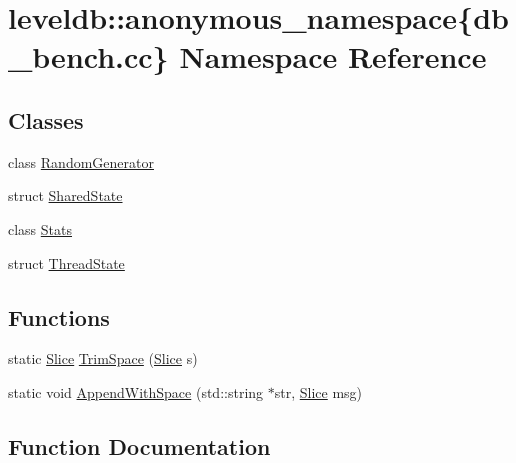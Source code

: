 \hypertarget{namespaceleveldb_1_1anonymous__namespace_02db__bench_8cc_03}{}\section{leveldb\+:\+:anonymous\+\_\+namespace\{db\+\_\+bench.\+cc\} Namespace Reference}
\label{namespaceleveldb_1_1anonymous__namespace_02db__bench_8cc_03}
\subsection*{Classes}
\begin{DoxyCompactItemize}
\item 
class \hyperlink{classleveldb_1_1anonymous__namespace_02db__bench_8cc_03_1_1_random_generator}{Random\+Generator}
\item 
struct \hyperlink{structleveldb_1_1anonymous__namespace_02db__bench_8cc_03_1_1_shared_state}{Shared\+State}
\item 
class \hyperlink{classleveldb_1_1anonymous__namespace_02db__bench_8cc_03_1_1_stats}{Stats}
\item 
struct \hyperlink{structleveldb_1_1anonymous__namespace_02db__bench_8cc_03_1_1_thread_state}{Thread\+State}
\end{DoxyCompactItemize}
\subsection*{Functions}
\begin{DoxyCompactItemize}
\item 
static \hyperlink{classleveldb_1_1_slice}{Slice} \hyperlink{namespaceleveldb_1_1anonymous__namespace_02db__bench_8cc_03_ad0ce55f066e9086aaeef3f824f27a1ec}{Trim\+Space} (\hyperlink{classleveldb_1_1_slice}{Slice} s)
\item 
static void \hyperlink{namespaceleveldb_1_1anonymous__namespace_02db__bench_8cc_03_adad447437f0b47a4f29b6f784422e1ec}{Append\+With\+Space} (std\+::string $\ast$str, \hyperlink{classleveldb_1_1_slice}{Slice} msg)
\end{DoxyCompactItemize}


\subsection{Function Documentation}
\hypertarget{namespaceleveldb_1_1anonymous__namespace_02db__bench_8cc_03_adad447437f0b47a4f29b6f784422e1ec}{}
